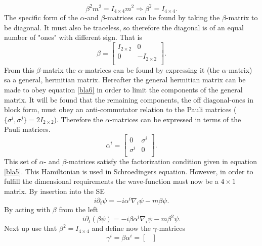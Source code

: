 \begin{example}
\begin{equation}
		\label{bla6}
	\end{equation} 
	\begin{equation}
		\beta^2m^2=I_{4\times 4}m^2\Rightarrow \beta^2=I_{4\times 4}.
	\end{equation} 
	The specific form of the $\alpha$-and $\beta$-matrices can be found by taking the $\beta$-matrix to be diagonal. It must also be traceless, so therefore the diagonal is of an equal number of "ones" with different sign. That is
	\begin{equation}
		\beta=\begin{bmatrix}
			I_{2\times 2} & 0\\
			0 & -I_{2\times 2}  \\
		\end{bmatrix}.
	\end{equation} 
	From this $\beta$-matrix the $\alpha$-matrices can be found by expressing it (the $\alpha$-matrix) sa a general, hermitian matrix. Hereafter the general hermitian matrix can be made to obey equation \ref{bla6} in order to limit the components of the general matrix. It will be found that the remaining components, the off diagonal-ones in block form, must obey an anti-commutator relation to the Pauli matrices ($\{\sigma^{i},\sigma^{j}\}=2I_{2\times 2}$). Therefore the $\alpha$-matrices can be expressed in terms of the Pauli matrices.
	\begin{equation}
		\alpha^{i}=\begin{bmatrix}
			0 & \sigma^{i}\\
			\sigma^{i} & 0 \\
		\end{bmatrix}.
	\end{equation} 
	This set of $\alpha$- and $\beta$-matrices satisfy the factorization condition given in equation \ref{bla5}. This Hamiltonian is used in Schroedingers equation. However, in order to fulfill the dimensional requirements the wave-function must now be a $4\times1$  matrix. By insertion into the SE
	\begin{equation}
		i\partial_t\psi=-i\alpha^{i}\nabla_i\psi-m\beta\psi.
	\end{equation}  
	By acting with $\beta$ from the left
	\begin{equation}
		i\partial_t(\beta\psi)=-i\beta\alpha^{i}\nabla_i\psi-m\beta^2\psi.
	\end{equation}  
	Next up use that $\beta^2=I_{4\times 4}$ and define now the $\gamma$-matrices
	\begin{equation}
		\gamma^{i}=\beta\alpha^{i}=\begin{bmatrix}

\end{bmatrix}
\end{equation}
\end{example}
